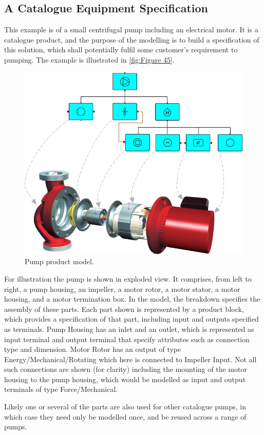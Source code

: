 \documentclass[../main.tex]{subfiles}
\begin{document}
\subsection{A Catalogue Equipment Specification}
This example is of a small centrifugal pump including an electrical motor. It is a
catalogue product, and the purpose of the modelling is to build a specification of this solution, which shall
potentially fulfil some customer's requirement to pumping. The example is illustrated in \autoref{fig:Figure 45}.

\begin{figure}[htb]\centering
  \includegraphics[width=.8\textwidth]{img/IMFmanual-img064.png}
  \caption{Pump product model.}
  \label{fig:Figure 45}
\end{figure}

For illustration the pump is shown in exploded view. It comprises, from left to right, a pump housing, an
impeller, a motor rotor, a motor stator, a motor housing, and a motor termination box.  In the model, the breakdown
specifies the assembly of these parts. Each part shown is represented by a product block, which provides a
specification of that part, including input and outputs specified as terminals. Pump Housing has an inlet
and an outlet, which is represented as input terminal and output terminal that specify attributes such as connection
type and dimension. Motor Rotor has an output of type Energy/Mechanical/Rotating which here is connected to 
Impeller Input. Not all such connections are shown (for clarity) including the mounting of the motor housing to the
pump housing, which would be modelled as input and output terminals of type Force/Mechanical.

Likely one or several of the parts are also used for other catalogue pumps, in which case they need only be modelled
once, and be reused across a range of pumps.
\end{document}
